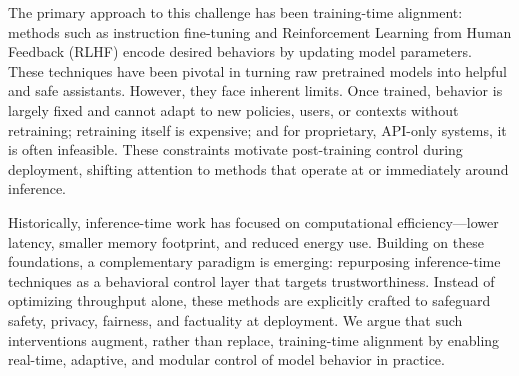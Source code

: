 The primary approach to this challenge has been training-time alignment: methods such as instruction fine-tuning and Reinforcement Learning from Human Feedback (RLHF) encode desired behaviors by updating model parameters. These techniques have been pivotal in turning raw pretrained models into helpful and safe assistants. However, they face inherent limits. Once trained, behavior is largely fixed and cannot adapt to new policies, users, or contexts without retraining; retraining itself is expensive; and for proprietary, API-only systems, it is often infeasible. These constraints motivate post-training control during deployment, shifting attention to methods that operate at or immediately around inference.


Historically, inference-time work has focused on computational efficiency—lower latency, smaller memory footprint, and reduced energy use. Building on these foundations, a complementary paradigm is emerging: repurposing inference-time techniques as a behavioral control layer that targets trustworthiness. Instead of optimizing throughput alone, these methods are explicitly crafted to safeguard safety, privacy, fairness, and factuality at deployment. We argue that such interventions augment, rather than replace, training-time alignment by enabling real-time, adaptive, and modular control of model behavior in practice.


